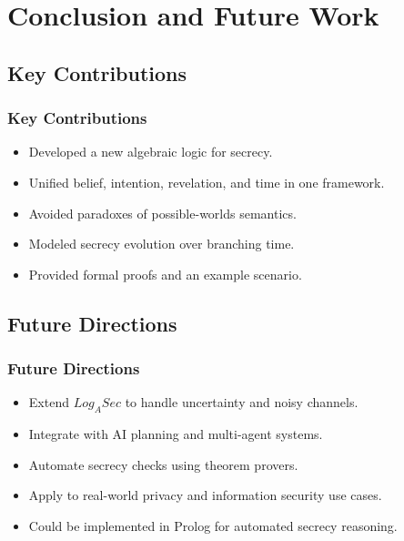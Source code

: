 \documentclass[aspectratio=169]{beamer}
\begin{document}

\section{Conclusion and Future Work}

\subsection{Key Contributions}
\begin{frame}
\frametitle{Key Contributions}
\begin{itemize}
    \item Developed a new algebraic logic for secrecy.
    \item Unified belief, intention, revelation, and time in one framework.
    \item Avoided paradoxes of possible-worlds semantics.
    \item Modeled secrecy evolution over branching time.
    \item Provided formal proofs and an example scenario.
\end{itemize}
\end{frame}

\subsection{Future Directions}
\begin{frame}
\frametitle{Future Directions}
\begin{itemize}
    \item Extend $Log_ASec$ to handle uncertainty and noisy channels.
    \item Integrate with AI planning and multi-agent systems.
    \item Automate secrecy checks using theorem provers.
    \item Apply to real-world privacy and information security use cases.
    \item Could be implemented in Prolog for automated secrecy reasoning.
\end{itemize}
\end{frame}

\end{document}
